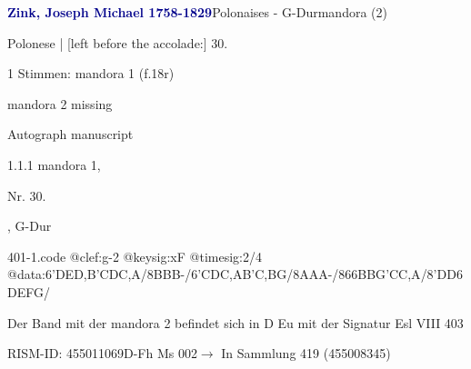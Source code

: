\documentclass[twocolumn]{book}
\begin{document}
\par \vspace{7pt} \textcolor{darkblue}{\textbf{Zink, Joseph Michael  1758-1829}}\hfillplus{\textbf{[401]}}\newline Polonaises - G-Dur\newline mandora (2)
\par \begin{itshape}[f.18r, at left:] Polonese | [left before the accolade:] 30.\end{itshape} 
\par \textcolor{darkblue}{}  1 Stimmen: mandora 1  (f.18r)\newline \begin{small} mandora 2 missing\end{small} \newline Autograph manuscript
\par 1.1.1  mandora 1, \begin{itshape}Nr. 30.\end{itshape}, G-Dur  
\begin{filecontents*}{401-1.code}
@clef:g-2
@keysig:xF
@timesig:2/4
@data:6'DED,B'CDC,A/8BBB-/6'CDC,AB'C,BG/8AAA-/866{BBG}{'CC,A}/8'DD{6DE}{FG}/
\end{filecontents*}
\newline
%
\par Der Band mit der mandora 2 befindet sich in D Eu mit der Signatur Esl VIII 403
\par RISM-ID: 455011069\newline D-Fh  Ms 002\newline $\rightarrow$ In Sammlung 419 (455008345)
      
\end{document}
